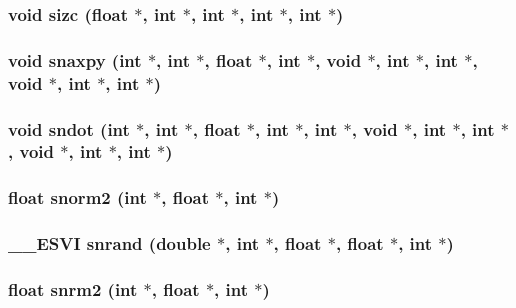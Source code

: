\subsubsection{\setlength{\rightskip}{0pt plus 5cm}void sizc (float $\ast$, int $\ast$, int $\ast$, int $\ast$, int $\ast$)}\label{essl_8h_d80d90f3c4de87a6bd2c5139f061c9b9}


\subsubsection{\setlength{\rightskip}{0pt plus 5cm}void snaxpy (int $\ast$, int $\ast$, float $\ast$, int $\ast$, void $\ast$, int $\ast$, int $\ast$, void $\ast$, int $\ast$, int $\ast$)}\label{essl_8h_822d61e70e43f9b28c4b82019b28c3cd}


\subsubsection{\setlength{\rightskip}{0pt plus 5cm}void sndot (int $\ast$, int $\ast$, float $\ast$, int $\ast$, int $\ast$, void $\ast$, int $\ast$, int $\ast$, void $\ast$, int $\ast$, int $\ast$)}\label{essl_8h_a9d4d6d88f350a77338e3297307505b4}


\subsubsection{\setlength{\rightskip}{0pt plus 5cm}float snorm2 (int $\ast$, float $\ast$, int $\ast$)}\label{essl_8h_c4a4f54137b24c43ab1380e798b19b16}


\subsubsection{\setlength{\rightskip}{0pt plus 5cm}\_\-\_\-ESVI snrand (double $\ast$, int $\ast$, float $\ast$, float $\ast$, int $\ast$)}\label{essl_8h_cfdaa069877ea6aa61c3415e95ff2006}


\subsubsection{\setlength{\rightskip}{0pt plus 5cm}float snrm2 (int $\ast$, float $\ast$, int $\ast$)}\label{essl_8h_b2be38ea07ba4bb19b9bddc0593a76fd}



